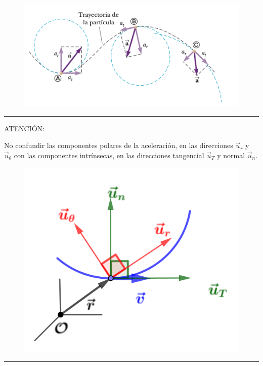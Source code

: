 \begin{figure}[H]
		\centering
		\includegraphics[width=.8\textwidth]{imagenes/imagenes02/T02IM39.png}
		\end{figure}
\vspace{-10mm} %
\rule{150pt}{0.4pt}

\begin{multicols}{2}
ATENCIÓN: 

No confundir las componentes polares de la aceleración, en las direcciones $\vec u_r$ y $\vec u_\theta$ con las componentes intrínsecas, en las direcciones tangencial $\vec u_T$ y normal $\vec u_n$.
\begin{figure}[H]
		\centering
		\includegraphics[width=.4\textwidth]{imagenes/imagenes02/T02IM35.png}
		\end{figure}
\end{multicols}
\vspace{-10mm} %
\rule{150pt}{0.4pt}

